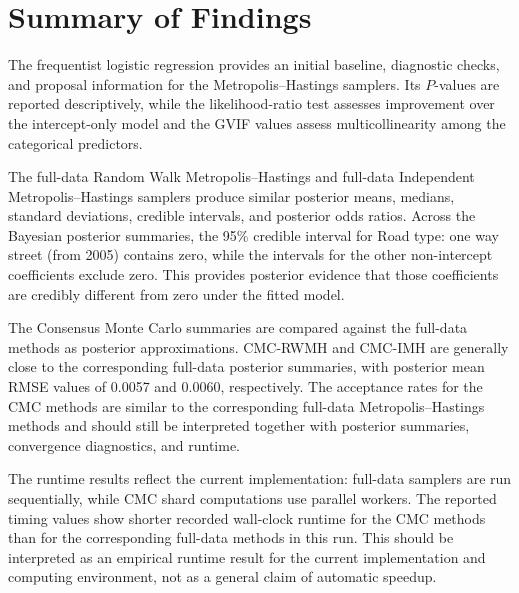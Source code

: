 \section{Summary of Findings}

The frequentist logistic regression provides an initial baseline, diagnostic checks, and proposal information for the Metropolis--Hastings samplers. Its $P$-values are reported descriptively, while the likelihood-ratio test assesses improvement over the intercept-only model and the GVIF values assess multicollinearity among the categorical predictors.

The full-data Random Walk Metropolis--Hastings and full-data Independent Metropolis--Hastings samplers produce similar posterior means, medians, standard deviations, credible intervals, and posterior odds ratios. Across the Bayesian posterior summaries, the 95\% credible interval for Road type: one way street (from 2005) contains zero, while the intervals for the other non-intercept coefficients exclude zero. This provides posterior evidence that those coefficients are credibly different from zero under the fitted model.

The Consensus Monte Carlo summaries are compared against the full-data methods as posterior approximations. CMC-RWMH and CMC-IMH are generally close to the corresponding full-data posterior summaries, with posterior mean RMSE values of 0.0057 and 0.0060, respectively. The acceptance rates for the CMC methods are similar to the corresponding full-data Metropolis--Hastings methods and should still be interpreted together with posterior summaries, convergence diagnostics, and runtime.

The runtime results reflect the current implementation: full-data samplers are run sequentially, while CMC shard computations use parallel workers. The reported timing values show shorter recorded wall-clock runtime for the CMC methods than for the corresponding full-data methods in this run. This should be interpreted as an empirical runtime result for the current implementation and computing environment, not as a general claim of automatic speedup.

